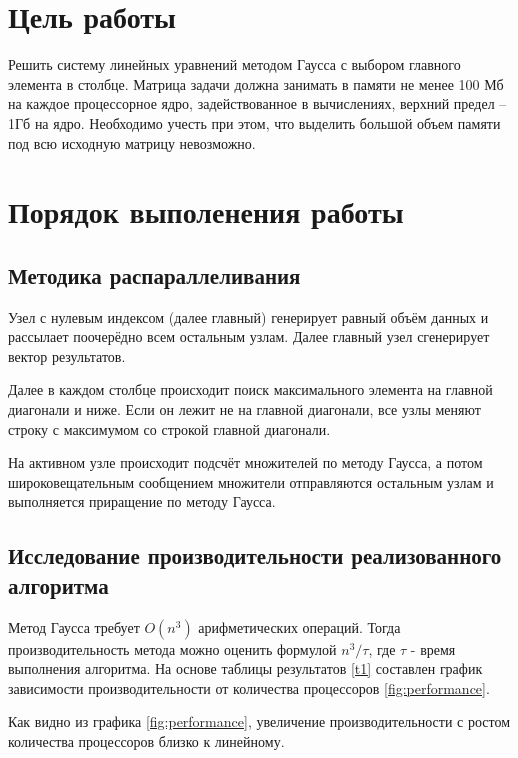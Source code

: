 	\section{Цель работы}
		Решить систему линейных уравнений методом Гаусса с выбором главного элемента в столбце. Матрица задачи должна занимать в памяти не менее 100 Мб на каждое процессорное ядро, задействованное в вычислениях, верхний предел – 1Гб на ядро. Необходимо учесть при этом, что выделить большой объем памяти под всю исходную матрицу невозможно.
	\section{Порядок выполенения работы}
		\subsection{Методика распараллеливания}
			Узел с нулевым индексом (далее главный) генерирует равный объём данных и рассылает поочерёдно всем остальным узлам. Далее главный узел сгенерирует вектор результатов.
			
			Далее в каждом столбце происходит поиск максимального элемента на главной диагонали и ниже. Если он лежит не на главной диагонали, все узлы меняют строку с максимумом со строкой главной диагонали.
			
			На активном узле происходит подсчёт множителей по методу Гаусса, а потом широковещательным сообщением множители отправляются остальным узлам и выполняется приращение по методу Гаусса.
			
		\subsection{Исследование производительности реализованного алгоритма}
			
			Метод Гаусса требует $ O(n^3) $ арифметических операций. Тогда производительность метода можно оценить формулой $ n^3/\tau $, где $ \tau $ - время выполнения алгоритма. На основе таблицы результатов \ref{t1} составлен график зависимости производительности от количества процессоров \ref{fig:performance}. 
			
			Как видно из графика \ref{fig:performance}, увеличение производительности с ростом количества процессоров близко к линейному.
			
